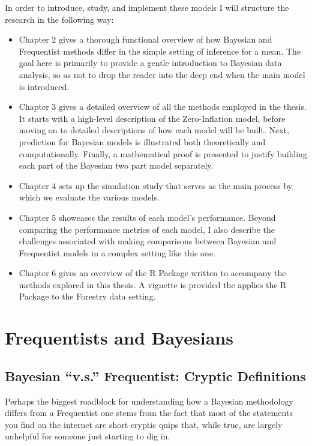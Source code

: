\documentclass[12pt,twoside]{reedthesis}
\begin{document}
In order to introduce, study, and implement these models I will structure the research in the following way:
\begin{itemize}
\item
  Chapter 2 gives a thorough functional overview of how Bayesian and Frequentist methods differ in the simple setting of inference for a mean. The goal here is primarily to provide a gentle introduction to Bayesian data analysis, so as not to drop the reader into the deep end when the main model is introduced.
\item
  Chapter 3 gives a detailed overview of all the methods employed in the thesis. It starts with a high-level description of the Zero-Inflation model, before moving on to detailed descriptions of how each model will be built. Next, prediction for Bayesian models is illustrated both theoretically and computationally. Finally, a mathematical proof is presented to justify building each part of the Bayesian two part model separately.
\item
  Chapter 4 sets up the simulation study that serves as the main process by which we evaluate the various models.
\item
  Chapter 5 showcases the results of each model's performance. Beyond comparing the performance metrics of each model, I also describe the challenges associated with making comparisons between Bayesian and Frequentist models in a complex setting like this one.
\item
  Chapter 6 gives an overview of the R Package written to accompany the methods explored in this thesis. A vignette is provided the applies the R Package to the Forestry data setting.
\end{itemize}
\hypertarget{bayes-freq}{%
\chapter{Frequentists and Bayesians}\label{bayes-freq}}

\hypertarget{bayesian-v.s.-frequentist-cryptic-definitions}{%
\section{Bayesian ``v.s.'' Frequentist: Cryptic Definitions}\label{bayesian-v.s.-frequentist-cryptic-definitions}}

Perhaps the biggest roadblock for understanding how a Bayesian methodology differs from a Frequentist one stems from the fact that most of the statements you find on the internet are short cryptic quips that, while true, are largely unhelpful for someone just starting to dig in.
\end{document}
